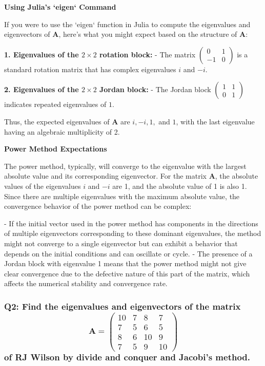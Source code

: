 \documentclass[8pt]{article}
\begin{document}
{{\textbf{Using Julia's `eigen` Command}

If you were to use the `eigen` function in Julia to compute the eigenvalues and eigenvectors of \(\mathbf{A}\), here's what you might expect based on the structure of \(\mathbf{A}\):

\textbf{1. Eigenvalues of the \(2 \times 2\) rotation block:}
   - The matrix \(\begin{pmatrix} 0 & 1 \\ -1 & 0 \end{pmatrix}\) is a standard rotation matrix that has complex eigenvalues \(i\) and \(-i\).

\textbf{2. Eigenvalues of the \(2 \times 2\) Jordan block:}
   - The Jordan block \(\begin{pmatrix} 1 & 1 \\ 0 & 1 \end{pmatrix}\) indicates repeated eigenvalues of \(1\).

Thus, the expected eigenvalues of \(\mathbf{A}\) are \(i, -i, 1,\) and \(1\), with the last eigenvalue having an algebraic multiplicity of 2.

\textbf{Power Method Expectations}

The power method, typically, will converge to the eigenvalue with the largest absolute value and its corresponding eigenvector. For the matrix \(\mathbf{A}\), the absolute values of the eigenvalues \(i\) and \(-i\) are 1, and the absolute value of 1 is also 1. Since there are multiple eigenvalues with the maximum absolute value, the convergence behavior of the power method can be complex:

- If the initial vector used in the power method has components in the directions of multiple eigenvectors corresponding to these dominant eigenvalues, the method might not converge to a single eigenvector but can exhibit a behavior that depends on the initial conditions and can oscillate or cycle.
- The presence of a Jordan block with eigenvalue 1 means that the power method might not give clear convergence due to the defective nature of this part of the matrix, which affects the numerical stability and convergence rate.

\subsubsection*{Q2: Find the eigenvalues and eigenvectors of the matrix
\[
\mathbf{A} = 
\begin{pmatrix}
10 & 7 & 8 & 7 \\
7 & 5 & 6 & 5 \\
8 & 6 & 10 & 9 \\
7 & 5 & 9 & 10 
\end{pmatrix}
\]
of RJ Wilson by divide and conquer and Jacobi’s method.}

}}
\end{document}
